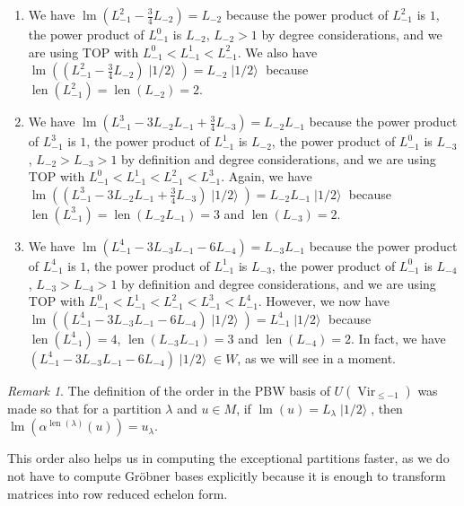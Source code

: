 \documentclass[a4paper, 12pt, reqno]{amsart}
\theoremstyle{remark}
\newtheorem{remark}[theorem]{Remark}
\DeclareMathOperator{\Vir}{Vir}
\DeclareMathOperator{\lm}{lm}
\DeclareMathOperator{\len}{len}
\DeclareMathOperator{\vachalf}{|1/2\rangle}
\begin{document}
\begin{enumerate}
\item We have $\lm(L_{-1}^2 - \frac{3}{4}L_{-2}) = L_{-2}$ because the power product of $L_{-1}^2$ is $1$, the power product of $L_{-1}^0$ is $L_{-2}$, $L_{-2} > 1$ by degree considerations, and we are using TOP with $L_{-1}^0 < L_{-1}^1 < L_{-1}^2$.
  We also have $\lm((L_{-1}^2 - \frac{3}{4}L_{-2})\vachalf) = L_{-2}\vachalf$ because $\len(L_{-1}^2) = \len(L_{-2}) = 2$.
\item We have $\lm(L_{-1}^3 - 3L_{-2}L_{-1} + \frac{3}{4}L_{-3}) = L_{-2}L_{-1}$ because the power product of $L_{-1}^3$ is $1$, the power product of $L_{-1}^1$ is $L_{-2}$, the power product of $L_{-1}^0$ is $L_{-3}$, $L_{-2} > L_{-3} > 1$ by definition and degree considerations, and we are using TOP with $L_{-1}^0 < L_{-1}^1 < L_{-1}^2 < L_{-1}^3$.
  Again, we have $\lm((L_{-1}^3 - 3L_{-2}L_{-1} + \frac{3}{4}L_{-3})\vachalf) = L_{-2}L_{-1}\vachalf$ because $\len(L_{-1}^3) = \len(L_{-2}L_{-1}) = 3$ and $\len(L_{-3}) = 2$.
\item We have $\lm(L_{-1}^4 - 3L_{-3}L_{-1} - 6L_{-4}) = L_{-3}L_{-1}$ because the power product of $L_{-1}^4$ is $1$, the power product of $L_{-1}^1$ is $L_{-3}$, the power product of $L_{-1}^0$ is $L_{-4}$, $L_{-3} > L_{-4} > 1$ by definition and degree considerations, and we are using TOP with $L_{-1}^0 < L_{-1}^1 < L_{-1}^2 < L_{-1}^3 < L_{-1}^4$.
  However, we now have $\lm((L_{-1}^4 - 3L_{-3}L_{-1} - 6L_{-4})\vachalf) = L_{-1}^4\vachalf$ because $\len(L_{-1}^4) = 4$, $\len(L_{-3}L_{-1}) = 3$ and $\len(L_{-4}) = 2$.
  In fact, we have $(L_{-1}^4 - 3L_{-3}L_{-1} - 6L_{-4})\vachalf \in W$, as we will see in a moment.
\end{enumerate}

\begin{remark}
  \label{rmk:49}
  The definition of the order in the PBW basis of $U(\Vir_{\le -1})$ was made so that for a partition $\lambda$ and $u \in M$, if $\lm(u) = L_{\lambda}\vachalf$, then $\lm(\alpha^{\len(\lambda)}(u)) = u_{\lambda}$.

  This order also helps us in computing the exceptional partitions faster, as we do not have to compute Gröbner bases explicitly because it is enough to transform matrices into row reduced echelon form.
\end{remark}
\end{document}
